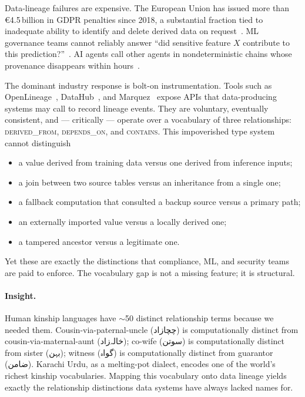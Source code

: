 \documentclass[10pt,twocolumn]{article}
\newcommand{\ur}[1]{{\urdufont #1}}
\begin{document}
Data-lineage failures are expensive. The European Union has issued more than \euro{}4.5\,billion in GDPR penalties since 2018, a substantial fraction tied to inadequate ability to identify and delete derived data on request~\cite{gdpr-fines}. ML governance teams cannot reliably answer ``did sensitive feature $X$ contribute to this prediction?''~\cite{mlflow-lineage,featurestore}. AI agents call other agents in nondeterministic chains whose provenance disappears within hours~\cite{ai-agent-provenance}.

The dominant industry response is bolt-on instrumentation. Tools such as OpenLineage~\cite{openlineage}, DataHub~\cite{datahub}, and Marquez~\cite{marquez} expose APIs that data-producing systems may call to record lineage events. They are voluntary, eventually consistent, and — critically — operate over a vocabulary of three relationships: \textsc{derived\_from}, \textsc{depends\_on}, and \textsc{contains}. This impoverished type system cannot distinguish

\begin{itemize}
\item a value derived from training data versus one derived from inference inputs;
\item a join between two source tables versus an inheritance from a single one;
\item a fallback computation that consulted a backup source versus a primary path;
\item an externally imported value versus a locally derived one;
\item a tampered ancestor versus a legitimate one.
\end{itemize}

Yet these are exactly the distinctions that compliance, ML, and security teams are paid to enforce. The vocabulary gap is not a missing feature; it is structural.

\paragraph{Insight.}
Human kinship languages have $\sim$50 distinct relationship terms because we needed them. Cousin-via-paternal-uncle (\ur{چچا‌زاد}) is computationally distinct from cousin-via-maternal-aunt (\ur{خالہ‌زاد}); co-wife (\ur{سوتن}) is computationally distinct from sister (\ur{بہن}); witness (\ur{گواہ}) is computationally distinct from guarantor (\ur{ضامن}). Karachi Urdu, as a melting-pot dialect, encodes one of the world's richest kinship vocabularies. Mapping this vocabulary onto data lineage yields exactly the relationship distinctions data systems have always lacked names for.
\end{document}
